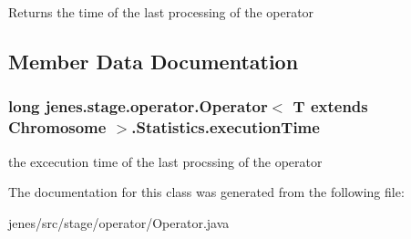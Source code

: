 \begin{DoxyReturn}{Returns}
the time of the last processing of the operator 
\end{DoxyReturn}


\subsection{Member Data Documentation}
\hypertarget{classjenes_1_1stage_1_1operator_1_1_operator_3_01_t_01extends_01_chromosome_01_4_1_1_statistics_a3e7fc955df9ca708795c24336b12f937}{
\subsubsection[{execution\-Time}]{\setlength{\rightskip}{0pt plus 5cm}long jenes.\-stage.\-operator.\-Operator$<$ T extends Chromosome $>$.Statistics.\-execution\-Time\hspace{0.3cm}{\ttfamily [protected]}}}\label{classjenes_1_1stage_1_1operator_1_1_operator_3_01_t_01extends_01_chromosome_01_4_1_1_statistics_a3e7fc955df9ca708795c24336b12f937}
the excecution time of the last procssing of the operator 

The documentation for this class was generated from the following file\-:\begin{DoxyCompactItemize}
\item 
jenes/src/stage/operator/Operator.\-java\end{DoxyCompactItemize}
